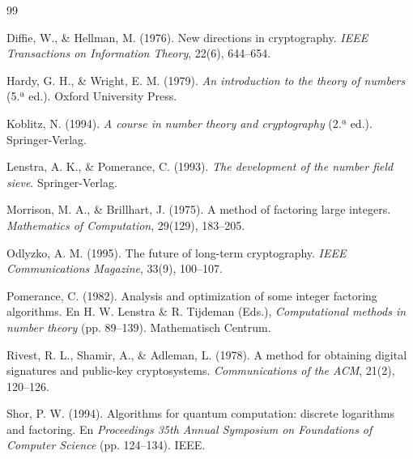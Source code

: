 \documentclass[11pt,a4paper,spanish]{book}
\begin{document}
\begin{thebibliography}{99}

Diffie, W., \& Hellman, M. (1976). New directions in cryptography. \emph{IEEE Transactions on Information Theory}, 22(6), 644--654.

Hardy, G. H., \& Wright, E. M. (1979). \emph{An introduction to the theory of numbers} (5.ª ed.). Oxford University Press. 

Koblitz, N. (1994). \emph{A course in number theory and cryptography} (2.ª ed.). Springer-Verlag.

Lenstra, A. K., \& Pomerance, C. (1993). \emph{The development of the number field sieve}. Springer-Verlag.

Morrison, M. A., \& Brillhart, J. (1975). A method of factoring large integers. \emph{Mathematics of Computation}, 29(129), 183--205.

Odlyzko, A. M. (1995). The future of long-term cryptography. \emph{IEEE Communications Magazine}, 33(9), 100--107.

Pomerance, C. (1982). Analysis and optimization of some integer factoring algorithms. En H. W. Lenstra \& R. Tijdeman (Eds.), \emph{Computational methods in number theory} (pp. 89--139). Mathematisch Centrum.

Rivest, R. L., Shamir, A., \& Adleman, L. (1978). A method for obtaining digital signatures and public-key cryptosystems. \emph{Communications of the ACM}, 21(2), 120--126.

Shor, P. W. (1994). Algorithms for quantum computation: discrete logarithms and factoring. En \emph{Proceedings 35th Annual Symposium on Foundations of Computer Science} (pp. 124--134). IEEE.

\end{thebibliography}
\end{document}
